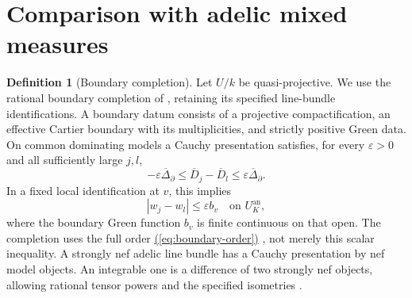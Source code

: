 \documentclass[11pt]{amsart}
\theoremstyle{definition}
\newtheorem{definition}[theorem]{Definition}
\theoremstyle{remark}
\numberwithin{equation}{section}
\newcommand{\an}{\mathrm{an}}
\renewcommand{\eqref}[1]{%
 \begingroup\hypersetup{linkcolor=equationviolet}%
 \hyperref[#1]{\textup{(\ref*{#1})}}%
 \endgroup}
\begin{document}
\section{Comparison with adelic mixed measures}\label{sec:adelic}

\begin{definition}[Boundary completion]\label{def:boundary}
Let \(U/k\) be quasi-projective. We use the rational boundary
completion of \cite[Sections 2.4--2.5]{YZ}, retaining its specified
line-bundle identifications. A boundary datum consists of a
projective compactification, an effective Cartier boundary with
its multiplicities, and strictly positive Green data.
On common dominating models a Cauchy presentation satisfies, for
every \(\varepsilon>0\) and all sufficiently large \(j,l\),
\begin{equation}\label{eq:boundary-order}
 -\varepsilon\overline\Delta_\partial
 \leq\overline D_j-\overline D_l
 \leq\varepsilon\overline\Delta_\partial .
\end{equation}
In a fixed local identification at \(v\), this implies
\[
 |w_j-w_l|\leq\varepsilon b_v\quad\text{on }U_K^\an,
\]
where the boundary Green function \(b_v\) is finite continuous
on that open. The completion uses the full order
\eqref{eq:boundary-order}, not merely this scalar inequality.
A strongly nef adelic line bundle has a Cauchy presentation by
nef model objects. An integrable one is a difference of two
strongly nef objects, allowing rational tensor powers and the
specified isometries \cite[Definition 2.5.2]{YZ}.
\end{definition}
\end{document}
